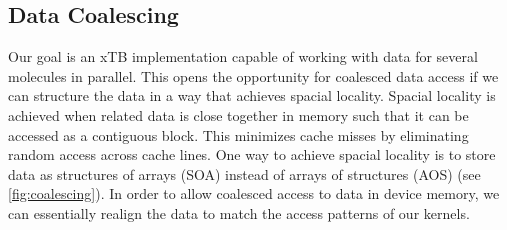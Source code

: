 \subsection{Data Coalescing}


Our goal is an xTB implementation capable of working with data for several molecules in parallel. This opens the opportunity for coalesced data access if we can structure the data in a way that achieves spacial locality. Spacial locality is achieved when related data is close together in memory such that it can be accessed as a contiguous block. This minimizes cache misses by eliminating random access across cache lines. One way to achieve spacial locality is to store data as structures of arrays (SOA) instead of arrays of structures (AOS) (see \autoref{fig:coalescing}). In order to allow coalesced access to data in device memory, we can essentially realign the data to match the access patterns of our kernels.%


